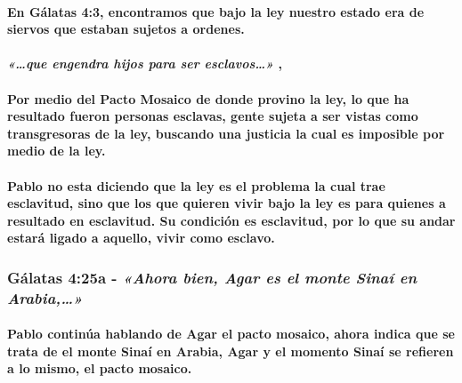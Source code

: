 \documentclass[11a pt,twoside]{article}
\newcommand{\scripture}[1]{%
  {\fontsize{12pt}{16pt}\selectfont\ScriptureFont\itshape #1}%
}
\let\oldsubsubsection\subsubsection
\renewcommand{\subsubsection}{\needspace{4\baselineskip}\oldsubsubsection}
\let\oldparagraph\paragraph
\renewcommand{\paragraph}{\needspace{3\baselineskip}\oldparagraph}
\begin{document}
\paragraph{En Gálatas 4:3, encontramos que bajo la ley nuestro estado
era de siervos que estaban sujetos a
ordenes.}\label{en-guxe1latas-43-encontramos-que-bajo-la-ley-nuestro-estado-era-de-siervos-que-estaban-sujetos-a-ordenes.}

\paragraph{\texorpdfstring{\scripture{«…que engendra hijos para ser esclavos…»},}{,}}\label{que-engendra-hijos-para-ser-esclavos}

\paragraph{Por medio del Pacto Mosaico de donde provino la ley, lo que
ha resultado fueron personas esclavas, gente sujeta a ser vistas como
transgresoras de la ley, buscando una justicia la cual es imposible por
medio de la
ley.}\label{por-medio-del-pacto-mosaico-de-donde-provino-la-ley-lo-que-ha-resultado-fueron-personas-esclavas-gente-sujeta-a-ser-vistas-como-transgresoras-de-la-ley-buscando-una-justicia-la-cual-es-imposible-por-medio-de-la-ley.}

\paragraph{Pablo no esta diciendo que la ley es el problema la cual trae
esclavitud, sino que los que quieren vivir bajo la ley es para quienes a
resultado en esclavitud. Su condición es esclavitud, por lo que su andar
estará ligado a aquello, vivir como
esclavo.}\label{pablo-no-esta-diciendo-que-la-ley-es-el-problema-la-cual-trae-esclavitud-sino-que-los-que-quieren-vivir-bajo-la-ley-es-para-quienes-a-resultado-en-esclavitud.-su-condiciuxf3n-es-esclavitud-por-lo-que-su-andar-estaruxe1-ligado-a-aquello-vivir-como-esclavo.}

\subsubsection{\texorpdfstring{Gálatas 4:25a -
\scripture{«Ahora bien, Agar es el monte Sinaí en Arabia,…»}}{Gálatas 4:25a - }}\label{guxe1latas-425a---ahora-bien-agar-es-el-monte-sinauxed-en-arabia}

\paragraph{Pablo continúa hablando de Agar el pacto mosaico, ahora
indica que se trata de el monte Sinaí en Arabia, Agar y el momento Sinaí
se refieren a lo mismo, el pacto
mosaico.}\label{pablo-continuxfaa-hablando-de-agar-el-pacto-mosaico-ahora-indica-que-se-trata-de-el-monte-sinauxed-en-arabia-agar-y-el-momento-sinauxed-se-refieren-a-lo-mismo-el-pacto-mosaico.}
\end{document}
